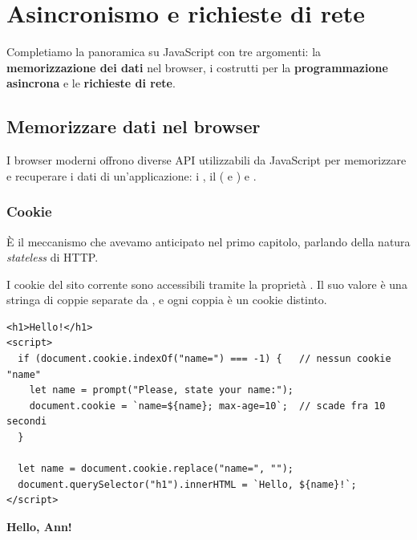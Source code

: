 \chapter{Asincronismo e richieste di rete}

Completiamo la panoramica su JavaScript con tre argomenti: la
\textbf{memorizzazione dei dati} nel browser, i costrutti per la
\textbf{programmazione asincrona} e le \textbf{richieste di rete}.

\section{Memorizzare dati nel browser}

I browser moderni offrono diverse API utilizzabili da JavaScript per
memorizzare e recuperare i dati di un'applicazione: i , il
 ( e ) e
.

\subsection{Cookie}


È il meccanismo che avevamo anticipato nel primo capitolo, parlando della
natura \textit{stateless} di HTTP.

I cookie del sito corrente sono accessibili tramite la proprietà
. Il suo valore è una stringa di coppie
 separate da \code{;}, e ogni coppia è un cookie distinto.

\begin{affianco}[0.6][c]
\codicepiccolo
\begin{lstlisting}[style=html, name=cookie.html]
<h1>Hello!</h1>
<script>
  if (document.cookie.indexOf("name=") === -1) {   // nessun cookie "name"
    let name = prompt("Please, state your name:");
    document.cookie = `name=${name}; max-age=10`;  // scade fra 10 secondi
  }

  let name = document.cookie.replace("name=", "");
  document.querySelector("h1").innerHTML = `Hello, ${name}!`;
</script>
\end{lstlisting}
\risultato
{}
\begin{browser}
  {\Lora\bfseries\Huge Hello, Ann!}
\end{browser}
\end{affianco}

